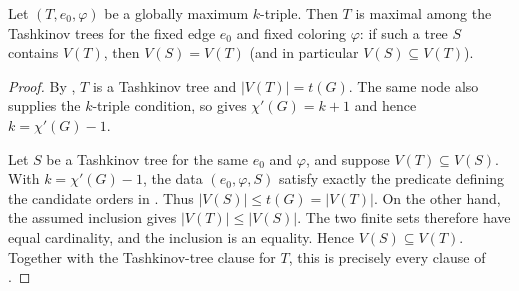 \begin{lemma}
Let $(T,e_0,\varphi)$ be a globally maximum $k$-triple.  Then $T$ is
maximal among the Tashkinov trees for the fixed edge $e_0$ and fixed
coloring $\varphi$: if such a tree $S$ contains $V(T)$, then
$V(S)=V(T)$ (and in particular $V(S)\subseteq V(T)$).
\end{lemma}
\begin{proof}
By , $T$ is a Tashkinov tree and
$|V(T)|=t(G)$.  The same node also supplies the $k$-triple condition, so
 gives $\chi'(G)=k+1$ and hence
$k=\chi'(G)-1$.

Let $S$ be a Tashkinov tree for the same $e_0$ and $\varphi$, and suppose
$V(T)\subseteq V(S)$.  With $k=\chi'(G)-1$, the data
$(e_0,\varphi,S)$ satisfy exactly the predicate defining the candidate
orders in .  Thus $|V(S)|\leq t(G)=|V(T)|$.
On the other hand, the assumed inclusion gives $|V(T)|\leq |V(S)|$.
The two finite sets therefore have equal cardinality, and the inclusion
is an equality.  Hence $V(S)\subseteq V(T)$.  Together with the
Tashkinov-tree clause for $T$, this is precisely every clause of
.
\end{proof}
